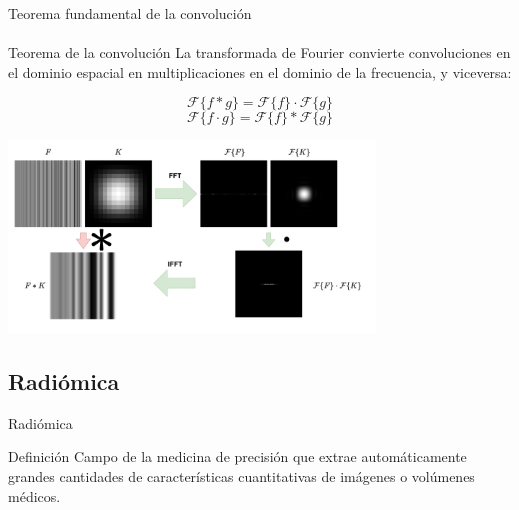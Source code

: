 \documentclass{beamer}
\begin{document}


\begin{frame}{Teorema fundamental de la convolución}
\framesubtitle{\insertsubsectionhead}
\begin{block}{Teorema de la convolución}
La transformada de Fourier convierte convoluciones en el dominio espacial en multiplicaciones en el dominio de la frecuencia, y viceversa:

\[
\mathcal{F}\{f * g\} = \mathcal{F}\{f\} \cdot \mathcal{F}\{g\}
\]
\[
\mathcal{F}\{f \cdot g\} = \mathcal{F}\{f\} * \mathcal{F}\{g\}
\]
\end{block}

\centering
\includegraphics[width=0.73\textwidth]{img/fourier.drawio.pdf} 

\end{frame}




\subsection{Radiómica}

\begin{frame}{Radiómica}
\begin{block}{Definición}
Campo de la medicina de precisión que extrae automáticamente grandes cantidades de características cuantitativas de imágenes o volúmenes médicos.
\end{block}


\begin{center}
\end{center}
\end{frame}
\end{document}
